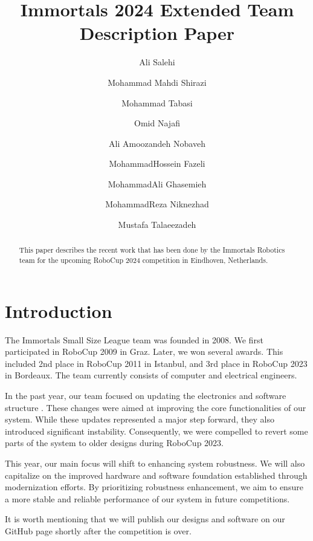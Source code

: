 \documentclass[runningheads]{llncs}
\begin{document}
%
\title{Immortals 2024 Extended Team Description Paper}

\author{Ali Salehi \and
Mohammad Mahdi Shirazi \and
Mohammad Tabasi \and
Omid Najafi \and
Ali Amoozandeh Nobaveh \and
MohammadHossein Fazeli \and
MohammadAli Ghasemieh \and
MohammadReza Niknezhad \and
Mustafa Talaeezadeh}
%
%
%
\maketitle              %
%
\begin{abstract}
This paper describes the recent work that has been done by the Immortals Robotics team for the upcoming RoboCup 2024 competition in Eindhoven, Netherlands.

\end{abstract}

\section{Introduction}
The Immortals Small Size League team was founded in 2008. We first participated in RoboCup 2009 in Graz. Later, we won several awards. This included 2nd place in RoboCup 2011 in Istanbul, and 3rd place in RoboCup 2023 in Bordeaux. The team currently consists of computer and electrical engineers.

In the past year, our team focused on updating the electronics and software structure \cite{ref_ETDP2023}. These changes were aimed at improving the core functionalities of our system. While these updates represented a major step forward, they also introduced significant instability. Consequently, we were compelled to revert some parts of the system to older designs during RoboCup 2023.

This year, our main focus will shift to enhancing system robustness. We will also capitalize on the improved hardware and software foundation established through modernization efforts. By prioritizing robustness enhancement, we aim to ensure a more stable and reliable performance of our system in future competitions.
 
It is worth mentioning that we will publish our designs and software on our GitHub page \cite{ref_github} shortly after the competition is over.
\end{document}

